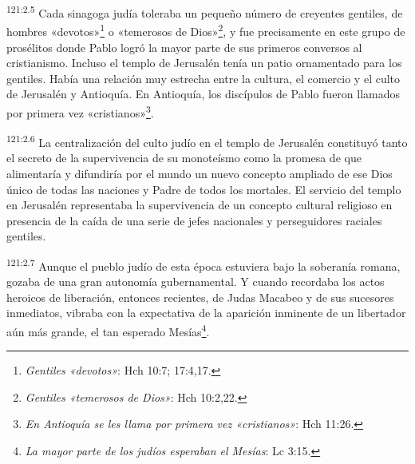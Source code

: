\par
\textsuperscript{121:2.5} Cada sinagoga judía toleraba un pequeño número de creyentes gentiles, de hombres «devotos»\footnote{\textit{Gentiles «devotos»}: Hch 10:7; 17:4,17.} o «temerosos de Dios»\footnote{\textit{Gentiles «temerosos de Dios»}: Hch 10:2,22.}, y fue precisamente en este grupo de prosélitos donde Pablo logró la mayor parte de sus primeros conversos al cristianismo. Incluso el templo de Jerusalén tenía un patio ornamentado para los gentiles. Había una relación muy estrecha entre la cultura, el comercio y el culto de Jerusalén y Antioquía. En Antioquía, los discípulos de Pablo fueron llamados por primera vez «cristianos»\footnote{\textit{En Antioquía se les llama por primera vez «cristianos»}: Hch 11:26.}.

\par
\textsuperscript{121:2.6} La centralización del culto judío en el templo de Jerusalén constituyó tanto el secreto de la supervivencia de su monoteísmo como la promesa de que alimentaría y difundiría por el mundo un nuevo concepto ampliado de ese Dios único de todas las naciones y Padre de todos los mortales. El servicio del templo en Jerusalén representaba la supervivencia de un concepto cultural religioso en presencia de la caída de una serie de jefes nacionales y perseguidores raciales gentiles.

\par
\textsuperscript{121:2.7} Aunque el pueblo judío de esta época estuviera bajo la soberanía romana, gozaba de una gran autonomía gubernamental. Y cuando recordaba los actos heroicos de liberación, entonces recientes, de Judas Macabeo y de sus sucesores inmediatos, vibraba con la expectativa de la aparición inminente de un libertador aún más grande, el tan esperado Mesías\footnote{\textit{La mayor parte de los judíos esperaban el Mesías}: Lc 3:15.}.


